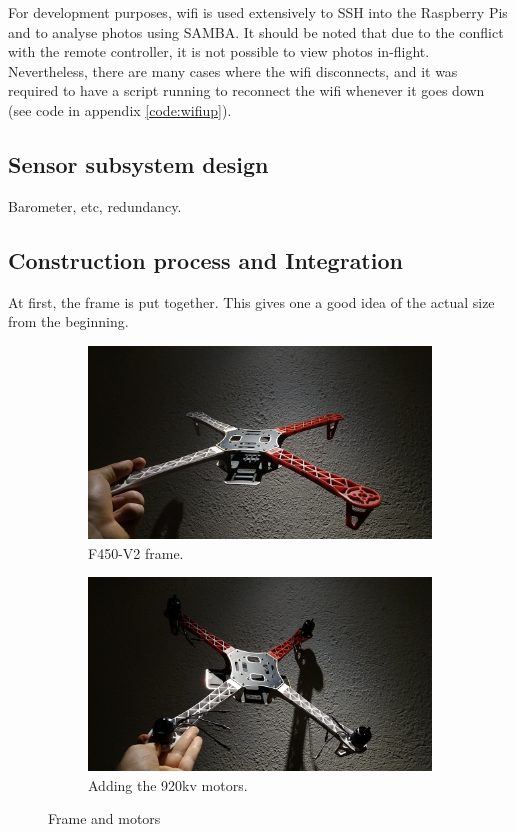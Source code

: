 For development purposes, wifi is used extensively to SSH into the Raspberry Pis and to analyse photos using SAMBA. It should be noted that due to the conflict with the remote controller, it is not possible to view photos in-flight. Nevertheless, there are many cases where the wifi disconnects, and it was required to have a script running to reconnect the wifi whenever it goes down (see code in appendix \ref{code:wifiup}).

\subsection{Sensor subsystem design}

Barometer, etc, redundancy.

\subsection{Construction process and Integration}

At first, the frame is put together. This gives one a good idea of the actual size from the beginning.

\begin{figure}[H]
\begin{subfigure}{0.5\textwidth}
\centering
\includegraphics[scale=0.1]{images/drone-build-frame.jpg}
\caption{F450-V2 frame.}
\label{fig:frame}
\end{subfigure}
\begin{subfigure}{0.5\textwidth}
\centering
\includegraphics[scale=0.1]{images/drone-build-motors.jpg}
\caption{Adding the 920kv motors.}
\label{fig:motors}
\end{subfigure}
\caption{Frame and motors}
\label{fig:frame_motors}
\end{figure}

